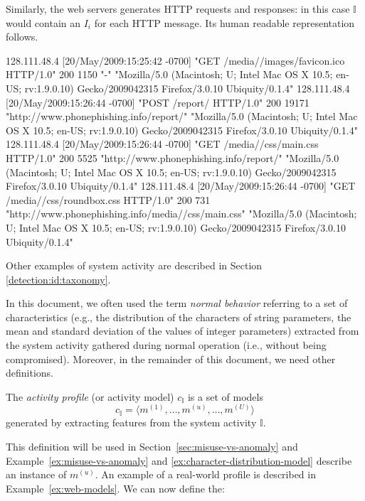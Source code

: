 Similarly, the web servers generates \ac{HTTP} requests
and responses: in this case $\mathbb{I}$ would contain an $I_{i}$ for
each \ac{HTTP} message. Its human readable representation
follows.

\begin{logs} 128.111.48.4 [20/May/2009:15:25:42 -0700] "GET
/media//images/favicon.ico HTTP/1.0" 200 1150 "-" "Mozilla/5.0
(Macintosh; U; Intel Mac OS X 10.5; en-US; rv:1.9.0.10)
Gecko/2009042315 Firefox/3.0.10 Ubiquity/0.1.4" 128.111.48.4
[20/May/2009:15:26:44 -0700] "POST /report/ HTTP/1.0" 200 19171
"http://www.phonephishing.info/report/" "Mozilla/5.0 (Macintosh; U;
Intel Mac OS X 10.5; en-US; rv:1.9.0.10) Gecko/2009042315
Firefox/3.0.10 Ubiquity/0.1.4" 128.111.48.4 [20/May/2009:15:26:44
-0700] "GET /media//css/main.css HTTP/1.0" 200 5525
"http://www.phonephishing.info/report/" "Mozilla/5.0 (Macintosh; U;
Intel Mac OS X 10.5; en-US; rv:1.9.0.10) Gecko/2009042315
Firefox/3.0.10 Ubiquity/0.1.4" 128.111.48.4 [20/May/2009:15:26:44
-0700] "GET /media//css/roundbox.css HTTP/1.0" 200 731
"http://www.phonephishing.info/media//css/main.css" "Mozilla/5.0
(Macintosh; U; Intel Mac OS X 10.5; en-US; rv:1.9.0.10)
Gecko/2009042315 Firefox/3.0.10 Ubiquity/0.1.4"
\end{logs}

Other examples of system activity are described in Section
\ref{detection:id:taxonomy}.

In this document, we often used the term \emph{normal behavior}
referring to a set of characteristics (e.g., the distribution of the
characters of string parameters, the mean and standard deviation of
the values of integer parameters) extracted from the system activity
gathered during normal operation (i.e., without being
compromised). Moreover, in the remainder of this document, we need
other definitions.

\begin{definition}\label{def:activity-model}
  The \emph{activity profile} (or activity model) $c_{\mathbb{I}}$ is
  a set of models
  \begin{displaymath}
    c_{\mathbb{I}} = \langle m^{(1)}, \dots, m^{(u)}, \dots, m^{(U)}
    \rangle
  \end{displaymath} generated by extracting features from the system
  activity $\mathbb{I}$.
\end{definition}

\noindent This definition will be used in
Section~\ref{sec:misuse-vs-anomaly} and
Example~\ref{ex:misuse-vs-anomaly} and
\ref{ex:character-distribution-model} describe an instance of
$m^{(u)}$. An example of a real-world profile is described in
Example~\ref{ex:web-models}. We can now define the:


